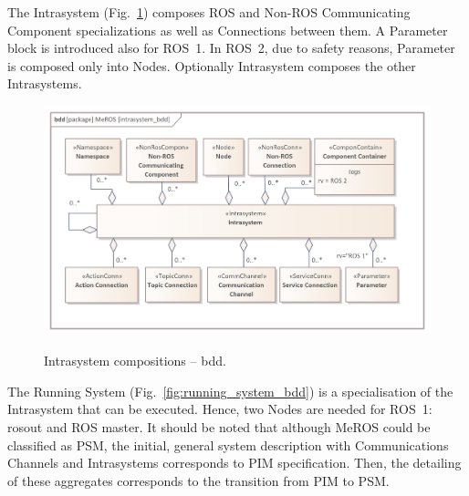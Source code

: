 \documentclass[11pt,oneside,a4paper]{article}
\begin{document}
	The Intrasystem (Fig.~\ref{fig:intrasystem_bdd}) composes ROS and Non-ROS Communicating Component specializations as well as Connections between them. A Parameter block is introduced also for ROS~1. In ROS~2, due to safety reasons, Parameter is composed only into Nodes. Optionally Intrasystem composes the other Intrasystems.
	

	\begin{figure}[H]
		\centering
		\begin{center}
			{\includegraphics[scale=1.0]{img/meros_pkg/intrasystem_bdd.png}}
		\end{center}
		\caption{Intrasystem compositions -- bdd.} 
		\label{fig:intrasystem_bdd}
	\end{figure} 
	 
  	The Running System (Fig.~\ref{fig:running_system_bdd}) is a specialisation of the Intrasystem that can be executed. Hence, two Nodes are needed for ROS~1: rosout and ROS master. 
	It should be noted that although MeROS could be classified as PSM, the initial, general system description with Communications Channels and Intrasystems corresponds to PIM specification. Then, the detailing of these aggregates corresponds to the transition from PIM to PSM. 
	
\end{document}
